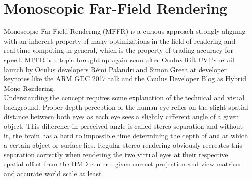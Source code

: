 
\section{Monoscopic Far-Field Rendering}
Monoscopic Far-Field Rendering (MFFR) is a curious approach strongly aligning with an inherent property of many optimizations in the field of rendering and real-time computing in general, which is the property of trading accuracy for speed. MFFR is a topic brought up again soon after Oculus Rift CV1's retail launch by Oculus developers Rémi Palandri and Simon Green at developer keynotes like the ARM GDC 2017 talk\cite{DiDonato.01.03.2017} and the Oculus Developer Blog as Hybrid Mono Rendering\cite{Palandri.2016}. \\
Understanding the concept requires some explanation of the technical and visual background. Proper depth perception of the human eye relies on the slight spatial distance between both eyes as each eye sees a slightly different angle of a given object. This difference in perceived angle is called stereo separation and without it, the brain has a hard to impossible time determining the depth of and at which a certain object or surface lies. Regular stereo rendering obviously recreates this separation correctly when rendering the two virtual eyes at their respective spatial offset from the HMD center - given correct projection and view matrices and accurate world scale at least. \\

